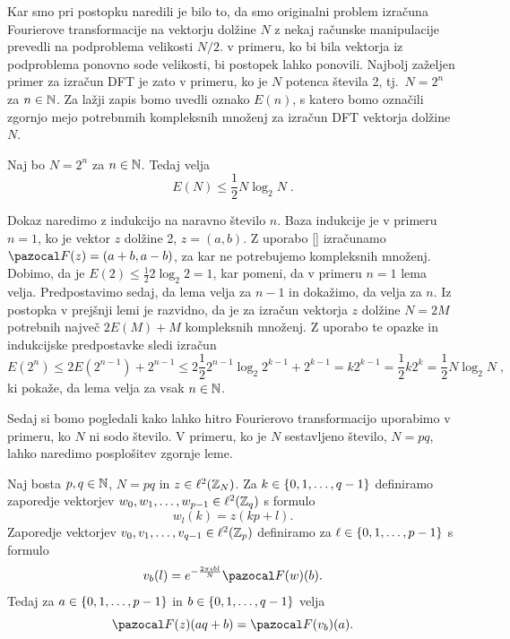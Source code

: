 Kar smo pri postopku naredili je bilo to, da smo originalni problem izračuna Fourierove transformacije na vektorju dolžine $N$ z nekaj računske manipulacije prevedli na podproblema velikosti $N/2$. v primeru, ko bi bila vektorja iz podproblema ponovno sode velikosti, bi postopek lahko ponovili. Najbolj zaželjen primer za izračun DFT je zato v primeru, ko je $N$ potenca števila 2, tj.\ $N = 2^n$ za $n \in \mathbb N$. Za lažji zapis bomo uvedli oznako $E(n)$, s katero bomo označili zgornjo mejo potrebnmih kompleksnih množenj za izračun DFT vektorja dolžine $N$.
%
\begin{lema}
Naj bo $N = 2^n$ za $n \in \mathbb N$. Tedaj velja
\begin{equation*}
  E(N) \leq \frac{1}{2} N \log_2N \;.
\end{equation*}
\end{lema}
%
\begin{dokaz}
Dokaz naredimo z indukcijo na naravno število $n$. Baza indukcije je v primeru $n = 1$, ko je vektor $z$ dolžine 2, $z = (a, b)$. Z uporabo \eqref{} %
izračunamo $\F(z) = (a + b, a - b)$, za kar ne potrebujemo kompleksnih množenj. Dobimo, da je $E(2) \leq \frac{1}{2} 2 \log_2 2 = 1$, kar pomeni, da v primeru $n = 1$ lema velja. Predpostavimo sedaj, da lema velja za $n - 1$ in dokažimo, da velja za $n$. Iz postopka v prejšnji lemi je razvidno, da je za izračun vektorja $z$ dolžine $N = 2M$ potrebnih največ $2E(M) + M$ kompleksnih množenj. Z uporabo te opazke in indukcijske predpostavke sledi izračun
\begin{equation*}
  E(2^n) \leq 2 E(2^{n-1}) + 2^{n-1} \leq 2\frac{1}{2} 2^{n-1} \log_{2} 2^{k-1} + 2^{k-1} = k 2^{k-1} = \frac{1}{2} k 2^k = \frac{1}{2} N \log_2N \;,
\end{equation*}
ki pokaže, da lema velja za vsak $n \in \mathbb N$.
\end{dokaz}
%
Sedaj si bomo pogledali kako lahko hitro Fourierovo transformacijo uporabimo v primeru, ko $N$ ni sodo število. V primeru, ko je $N$ sestavljeno število, $N = pq$, lahko naredimo posplošitev zgornje leme.
%
\begin{lema}
Naj bosta $p, q \in \mathbb N$, $N = pq$ in $z \in \ell^2(\mathbb Z_N)$. Za $k \in \left\{0, 1, \ldots, q-1\right\}$ definiramo zaporedje vektorjev $w_0, w_1, \ldots, w_{p-1} \in \ell^2(\mathbb Z_q)$ s formulo
$$w_l(k) = z(kp + l).$$
Zaporedje vektorjev $v_0, v_1, \ldots, v_{q-1} \in \ell^2(\mathbb Z_p)$ definiramo za $\ell \in \left\{0, 1, \ldots, p-1\right\}$ s formulo
$$v_b(l) = e^{-\frac{2\pi\imath bl}{N}} \F(w)(b).$$
Tedaj za $a \in \left\{0, 1, \ldots, p-1\right\}$ in $b \in \left\{0, 1, \ldots, q-1\right\}$ velja
\begin{equation}\label{eq:aqb}
\F(z)(aq + b) = \F(v_b)(a).
\end{equation}
\end{lema}
